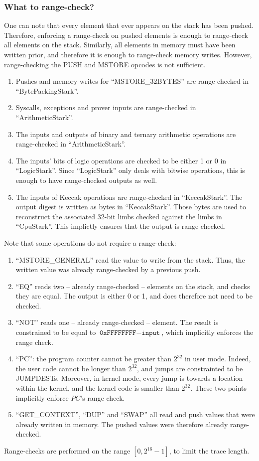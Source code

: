 \subsubsection{What to range-check?}
One can note that every element that ever appears on the stack has been pushed. Therefore, enforcing a range-check on pushed elements is enough to range-check all elements on the stack. Similarly, all elements in memory must have been written prior, and therefore it is enough to range-check memory writes. However, range-checking the PUSH and MSTORE opcodes is not sufficient.
\begin{enumerate}
  \item Pushes and memory writes for ``MSTORE\_32BYTES'' are range-checked in ``BytePackingStark''.
  \item Syscalls, exceptions and prover inputs are range-checked in ``ArithmeticStark''.
  \item The inputs and outputs of binary and ternary arithmetic operations are range-checked in ``ArithmeticStark''.
  \item The inputs' bits of logic operations are checked to be either 1 or 0 in ``LogicStark''. Since ``LogicStark'' only deals with bitwise operations, this is enough to have range-checked outputs as well.
  \item The inputs of Keccak operations are range-checked in ``KeccakStark''. The output digest is written as bytes in ``KeccakStark''. Those bytes are used to reconstruct the associated 32-bit limbs checked against the limbs in ``CpuStark''. This implictly ensures that the output is range-checked.
\end{enumerate}
Note that some operations do not require a range-check:
\begin{enumerate}
  \item ``MSTORE\_GENERAL'' read the value to write from the stack. Thus, the written value was already range-checked by a previous push.
  \item ``EQ'' reads two -- already range-checked -- elements on the stack, and checks they are equal. The output is either 0 or 1, and does therefore not need to be checked.
  \item ``NOT'' reads one -- already range-checked -- element. The result is constrained to be equal to $\texttt{0xFFFFFFFF} - \texttt{input}$, which implicitly enforces the range check.
  \item ``PC'': the program counter cannot be greater than $2^{32}$ in user mode. Indeed, the user code cannot be longer than $2^{32}$, and jumps are constrainted to be JUMPDESTs. Moreover, in kernel mode, every jump is towards a location within the kernel, and the kernel code is smaller than $2^{32}$. These two points implicitly enforce $PC$'s range check.
  \item ``GET\_CONTEXT'', ``DUP'' and ``SWAP'' all read and push values that were already written in memory. The pushed values were therefore already range-checked.
\end{enumerate}
Range-checks are performed on the range $[0, 2^{16} - 1]$, to limit the trace length.

